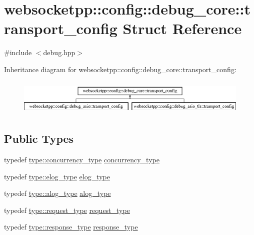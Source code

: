 \hypertarget{structwebsocketpp_1_1config_1_1debug__core_1_1transport__config}{}\section{websocketpp\+:\+:config\+:\+:debug\+\_\+core\+:\+:transport\+\_\+config Struct Reference}
\label{structwebsocketpp_1_1config_1_1debug__core_1_1transport__config}


{\ttfamily \#include $<$debug.\+hpp$>$}

Inheritance diagram for websocketpp\+:\+:config\+:\+:debug\+\_\+core\+:\+:transport\+\_\+config\+:\begin{figure}[H]
\begin{center}
\leavevmode
\includegraphics[height=1.739130cm]{structwebsocketpp_1_1config_1_1debug__core_1_1transport__config}
\end{center}
\end{figure}
\subsection*{Public Types}
\begin{DoxyCompactItemize}
\item 
typedef \hyperlink{structwebsocketpp_1_1config_1_1debug__core_aada73b9183fc032c25178870dbb4d83d}{type\+::concurrency\+\_\+type} \hyperlink{structwebsocketpp_1_1config_1_1debug__core_1_1transport__config_a3dcd0e3cfc508d9a7e1c096735915f36}{concurrency\+\_\+type}
\item 
typedef \hyperlink{structwebsocketpp_1_1config_1_1debug__core_acfa1ded7f80d6a7276b0ec3fd0859fc3}{type\+::elog\+\_\+type} \hyperlink{structwebsocketpp_1_1config_1_1debug__core_1_1transport__config_a408656d4012b1b02d296bb9a7da84c49}{elog\+\_\+type}
\item 
typedef \hyperlink{structwebsocketpp_1_1config_1_1debug__core_a2e57e38001385110ce0fbbd17af6b0af}{type\+::alog\+\_\+type} \hyperlink{structwebsocketpp_1_1config_1_1debug__core_1_1transport__config_a400180c9d501bcdac92a42eee2e233e6}{alog\+\_\+type}
\item 
typedef \hyperlink{structwebsocketpp_1_1config_1_1debug__core_a597de872d5a5b6e9bd2fa1af18ccbbc6}{type\+::request\+\_\+type} \hyperlink{structwebsocketpp_1_1config_1_1debug__core_1_1transport__config_a39a4450305cfaa5c8211d3dff2a7c871}{request\+\_\+type}
\item 
typedef \hyperlink{structwebsocketpp_1_1config_1_1debug__core_aa11255cb23f43afb8884bc464aa5c572}{type\+::response\+\_\+type} \hyperlink{structwebsocketpp_1_1config_1_1debug__core_1_1transport__config_af3f1a34b5663166430b52e4dd1f1398a}{response\+\_\+type}
\end{DoxyCompactItemize}
